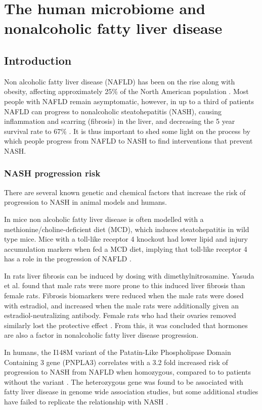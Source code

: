 \chapter{The human microbiome and nonalcoholic fatty liver disease}

\section{Introduction}
Non alcoholic fatty liver disease (NAFLD) has been on the rise along with obesity, affecting approximately 25\% of the North American population \cite{preiss2008non}. Most people with NAFLD remain asymptomatic, however, in up to a third of patients NAFLD can progress to nonalcoholic steatohepatitis (NASH), causing inflammation and scarring (fibrosis) in the liver, and decreasing the 5 year survival rate to 67\% \cite{propst1995prognosis}. It is thus important to shed some light on the process by which people progress from NAFLD to NASH to find interventions that prevent NASH.

\subsection{ NASH progression risk}
There are several known genetic and chemical factors that increase the risk of progression to NASH in animal models and humans.

In mice non alcoholic fatty liver disease is often modelled with a methionine/choline-deficient diet (MCD), which induces steatohepatitis in wild type mice. Mice with a toll-like receptor 4 knockout had lower lipid and injury accumulation markers when fed a MCD diet, implying that toll-like receptor 4 has a role in the progression of NAFLD \cite{rivera2007toll}.

In rats liver fibrosis can be induced by dosing with dimethylnitrosamine. Yasuda et al. \cite{yasuda1999suppressive} found that male rats were more prone to this induced liver fibrosis than female rats. Fibrosis biomarkers were reduced when the male rats were dosed with estradiol, and increased when the male rats were additionally given an estradiol-neutralizing antibody. Female rats who had their ovaries removed similarly lost the protective effect \cite{yasuda1999suppressive}. From this, it was concluded that hormones are also a factor in nonalcoholic fatty liver disease progression.

In humans, the I148M variant of the Patatin-Like Phospholipase Domain Containing 3 gene (PNPLA3) correlates with a 3.2 fold increased risk of progression to NASH from NAFLD when homozygous, compared to to patients without the variant \cite{sookoian2011meta}. The heterozygous gene was found to be associated with fatty liver disease in genome wide association studies, but some additional studies have failed to replicate the relationship with NASH \cite{sookoian2011meta}.

